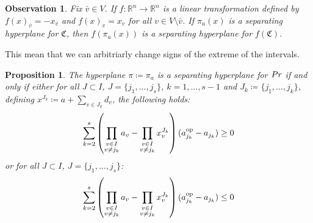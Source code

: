 \documentclass{article}
\newtheorem{proposition}[theorem]{Proposition}
\newtheorem{observation}[theorem]{Observation}
\begin{document}
\par	
\begin{observation}\label{obs: change sign}
Fix \(\bar{v}\in V\). If \(f:\mathbb{R}^{n}\to \mathbb{R}^{n}\) is a linear transformation defined by \(f(x)_{\bar{v}}= -x_{\bar{v}}\) and \(f(x)_v= x_{v}\) for all \(v\in V\setminus{\bar{v}}\). 
If \(\pi_a{}(x)\) is a separating hyperplane for \(\mathfrak{C}\), then \(f(\pi_a(x))\) is a separating hyperplane for \(f(\mathfrak{C})\).
\end{observation}
This mean that we can arbitriarly change signs of the extreme of the intervals.
%
\newcommand{\prodi}[1]{p(#1)}
\begin{proposition}
	\label{prop: sufficient and necessary sep hyperplane}
	The hyperplane \(\pi \coloneqq \pi_a\) is a separating hyperplane for \(Pr\) if and only if either for all \(J \subset I\), \(J = \{j_1,\ldots,j_s\}\), \(k = 1,\ldots,s-1\) and \(J_k \coloneqq \{j_1,\ldots,j_k\}\), defining \(x^{J_k}\coloneqq a + \sum_{v \in J_k}d_v\), the following holds:
	\begin{equation}
		\sum_{k = 2}^{s} \left(\prod_{\substack{v \in I \\ v \neq j_k}}a_v - \prod_{\substack{v \in I \\ v \neq j_k}}{x^{J_k}_v}\right) (a^{\text{op}}_{j_k}-a_{j_k})\geq 0
	\end{equation}
	or for all \(J \subset I\), \(J = \{j_1,\ldots,j_s\}\): 
	\begin{equation}
		\sum_{k = 2}^{s} \left(\prod_{\substack{v \in I \\ v \neq j_k}}a_v - \prod_{\substack{v \in I \\ v \neq j_k}}x^{J_k}_v\right) (a^{\text{op}}_{j_k}-a_{j_k})\leq 0
	\end{equation}
	
\end{proposition}
\end{document}
